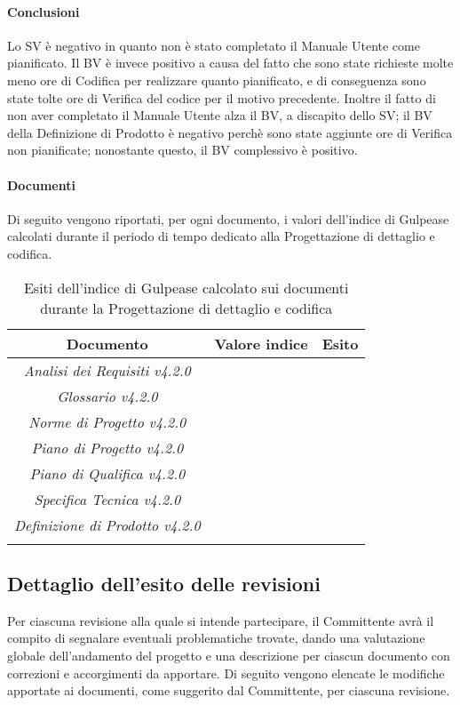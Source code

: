 \paragraph{Conclusioni}
Lo SV è negativo in quanto non è stato completato il Manuale Utente come pianificato.
Il BV è invece positivo a causa del fatto che sono state richieste molte meno ore di Codifica per realizzare quanto pianificato, e di conseguenza sono state tolte ore di Verifica del codice per il motivo precedente.
Inoltre il fatto di non aver completato il Manuale Utente alza il BV, a discapito dello SV; il BV della Definizione di Prodotto è negativo perchè sono state aggiunte ore di Verifica non pianificate; nonostante questo, il BV complessivo è positivo.


\paragraph{Documenti}
Di seguito vengono riportati, per ogni documento, i valori dell'indice di Gulpease calcolati durante il periodo di tempo dedicato alla Progettazione di dettaglio e codifica.

\begin{longtable}{|c|p{3cm}|p{3cm}|}
\toprule
\textbf{Documento} & \textbf{Valore indice} & \textbf{Esito} \\


\midrule
\emph{Analisi dei Requisiti v4.2.0} &  &  \\
\midrule
\emph{Glossario v4.2.0} &  &  \\
\midrule
\emph{Norme di Progetto v4.2.0} &   & \\
\midrule
\emph{Piano di Progetto v4.2.0} &   & \\
\midrule
\emph{Piano di Qualifica v4.2.0} &   & \\
\midrule
\emph{Specifica Tecnica v4.2.0} &  & \\
\midrule
\emph{Definizione di Prodotto v4.2.0} &  & \\
\bottomrule
\caption{Esiti dell'indice di Gulpease calcolato sui documenti durante la Progettazione di dettaglio e codifica}
\label{tab:changelog}
\end{longtable}

\subsection{Dettaglio dell'esito delle revisioni}
Per ciascuna revisione alla quale si intende partecipare, il Committente avrà il compito di segnalare eventuali problematiche trovate, dando una valutazione globale dell'andamento del progetto e una descrizione per ciascun documento con correzioni e accorgimenti da apportare.
Di seguito vengono elencate le modifiche apportate ai documenti, come suggerito dal Committente, per ciascuna revisione.
